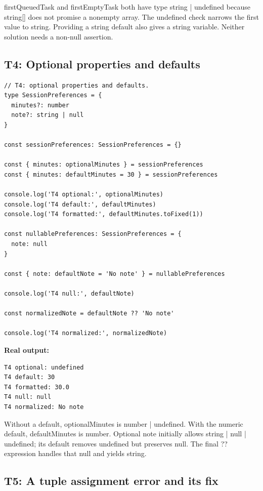 \documentclass[10pt,a4paper]{article}
\begin{document}
firstQueuedTask and firstEmptyTask both have type string | undefined because string[] does not promise a nonempty array. The undefined check narrows the first value to string. Providing a string default also gives a string variable. Neither solution needs a non-null assertion.

\subsection{T4: Optional properties and defaults}

\begin{lstlisting}[language=GuideJS]
// T4: optional properties and defaults.
type SessionPreferences = {
  minutes?: number
  note?: string | null
}

const sessionPreferences: SessionPreferences = {}

const { minutes: optionalMinutes } = sessionPreferences
const { minutes: defaultMinutes = 30 } = sessionPreferences

console.log('T4 optional:', optionalMinutes)
console.log('T4 default:', defaultMinutes)
console.log('T4 formatted:', defaultMinutes.toFixed(1))

const nullablePreferences: SessionPreferences = {
  note: null
}

const { note: defaultNote = 'No note' } = nullablePreferences

console.log('T4 null:', defaultNote)

const normalizedNote = defaultNote ?? 'No note'

console.log('T4 normalized:', normalizedNote)
\end{lstlisting}


\textbf{Real output:}

\begin{lstlisting}[language={}]
T4 optional: undefined
T4 default: 30
T4 formatted: 30.0
T4 null: null
T4 normalized: No note
\end{lstlisting}

Without a default, optionalMinutes is number | undefined. With the numeric default, defaultMinutes is number. Optional note initially allows string | null | undefined; its default removes undefined but preserves null. The final ?? expression handles that null and yields string.

\subsection{T5: A tuple assignment error and its fix}
\end{document}
